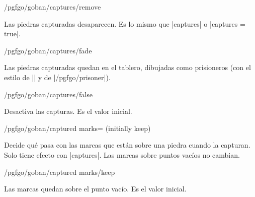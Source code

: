 	\begin{stylekey}{/pgfgo/goban/captures/remove}

		Las piedras capturadas desaparecen. Es lo mismo que |captures| o |captures = true|.
	\end{stylekey}

	\begin{stylekey}{/pgfgo/goban/captures/fade}

		Las piedras capturadas quedan en el tablero, dibujadas como prisioneros (con el estilo de |\prisoner| y de |/pgfgo/prisoner|).

		\begin{codeexample}[]

			\begin{goban}[captures = fade]
			\end{goban}
		\end{codeexample}
	\end{stylekey}

	\begin{stylekey}{/pgfgo/goban/captures/false}

		Desactiva las capturas. Es el valor inicial.
	\end{stylekey}

	\begin{key}{/pgfgo/goban/captured marks= (initially keep)}

		Decide qué pasa con las marcas que están sobre una piedra cuando la capturan. Solo tiene efecto con |captures|. Las marcas sobre puntos vacíos no cambian.

		\begin{codeexample}[]

			\begin{goban}
			\end{goban}

			\begin{goban}[captured marks = remove]
				\stones[b]{B1}
				\marks[triangle]{A1}
			\end{goban}
		\end{codeexample}
	\end{key}

	\begin{stylekey}{/pgfgo/goban/captured marks/keep}

		Las marcas quedan sobre el punto vacío. Es el valor inicial.
	\end{stylekey}


